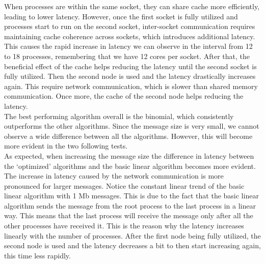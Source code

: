     When processes are within the same socket, they can share cache more
    efficiently, leading to lower latency. However, once the first socket
    is fully utilized and processes start to run on the second socket,
    inter-socket communication requires maintaining cache coherence
    across sockets, which introduces additional latency. This causes
    the rapid increase in latency we can observe in the interval from
    12 to 18 processes, remembering that we have 12 cores per socket.
    After that, the beneficial effect of the cache helps reducing the
    latency until the second socket is fully utilized. Then the second
    node is used and the latency drastically increases again. This
    require network communication, which is slower than shared memory
    communication. Once more, the cache of the second node helps
    reducing the latency. \\
    The best performing algorithm overall is the binomial, which 
    consistently outperforms the other algorithms. Since the message
    size is very small, we cannot observe a wide difference between
    all the algorithms. However, this will become more evident in the
    two following tests. \\
    As expected, when increasing the message size the difference in latency
    between the \enquote*{optimized} algorithms and the basic linear
    algorithm becomes more evident. The increase in latency caused by the
    network communication is more pronounced for larger messages. Notice
    the constant linear trend of the basic linear algorithm with 1 Mb
    messages. This is due to the fact that the basic linear algorithm
    sends the message from the root process to the last process in a
    linear way. This means that the last process will receive the message
    only after all the other processes have received it. This is the
    reason why the latency increases linearly with the number of processes.
    After the first node being fully utilized, the second node is used
    and the latency decreases a bit to then start increasing again, this
    time less rapidly.
